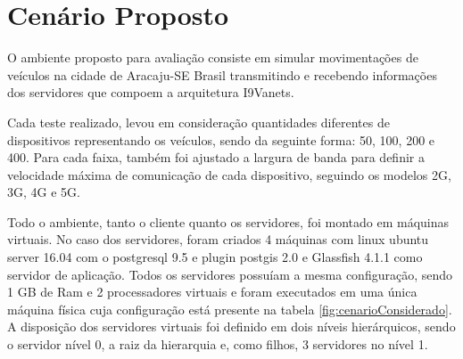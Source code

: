 \documentclass[
	12pt,				%
	oneside,			%
	a4paper,			%
	english,			%
	brazil				%
	]{abntex2ppgsi}
\begin{document}

\section{Cenário Proposto}

O ambiente proposto para avaliação consiste em simular movimentações de veículos na cidade de Aracaju-SE Brasil transmitindo e recebendo informações dos servidores que compoem a arquitetura I9Vanets. 

Cada teste realizado, levou em consideração quantidades diferentes de dispositivos representando os veículos, sendo da seguinte forma: 50, 100, 200 e 400. Para cada faixa, também foi ajustado a largura de banda para definir a velocidade máxima de comunicação de cada dispositivo, seguindo os modelos 2G, 3G, 4G e 5G.

Todo o ambiente, tanto o cliente quanto os servidores, foi montado em máquinas virtuais. No caso dos servidores,  foram criados 4 máquinas com linux ubuntu server 16.04 com o postgresql 9.5 e plugin postgis 2.0 e Glassfish 4.1.1 como servidor de aplicação. Todos os servidores possuíam a mesma configuração, sendo 1 GB de Ram e 2 processadores virtuais e foram executados em uma única máquina física cuja configuração está presente na tabela \ref{fig:cenarioConsiderado}. A disposição dos servidores virtuais foi definido em dois níveis hierárquicos, sendo o servidor nível 0, a raiz da hierarquia e, como filhos,  3 servidores no nível 1.
\end{document}
